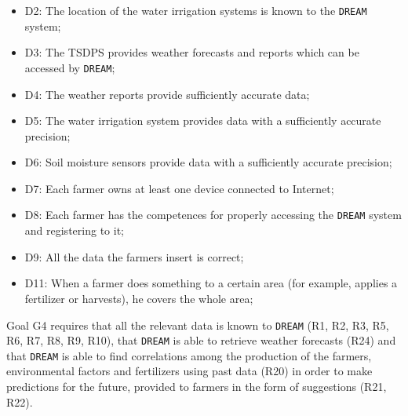 \documentclass{article}
\begin{document}
\begin{itemize}
    \item D2: The location of the water irrigation systems is known to the \verb|DREAM| system;
    
    \item D3: The TSDPS provides weather forecasts and reports which can be accessed by \verb|DREAM|;
    
    \item D4: The weather reports provide sufficiently accurate data;
    
    \item D5: The water irrigation system provides data with a sufficiently accurate precision;
    
    \item D6: Soil moisture sensors provide data with a sufficiently accurate precision;
    
    \item D7: Each farmer owns at least one device connected to Internet;
    
    \item D8: Each farmer has the competences for properly accessing the \verb|DREAM| system and registering to it;
    
    \item D9: All the data the farmers insert is correct;
    
    \item D11: When a farmer does something to a certain area (for example, applies a fertilizer or harvests), he covers the whole area;
\end{itemize}
Goal G4 requires that all the relevant data is known to \verb|DREAM| (R1, R2, R3, R5, R6, R7, R8, R9, R10), that \verb|DREAM| is able to retrieve weather forecasts (R24) and that \verb|DREAM| is able to find correlations among the production of the farmers, environmental factors and fertilizers using past data (R20) in order to make predictions for the future, provided to farmers in the form of suggestions (R21, R22).
\end{document}
